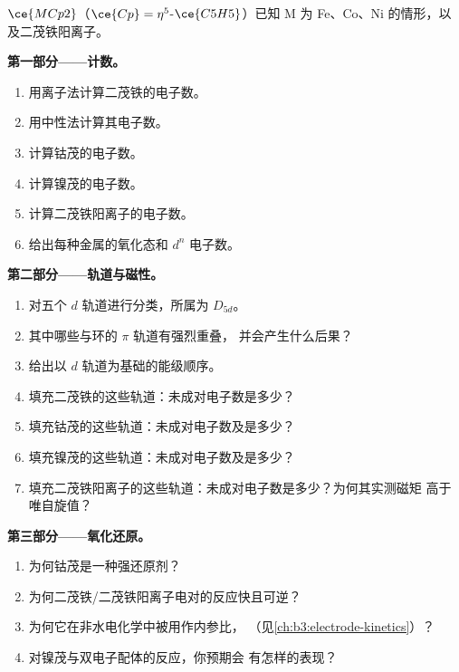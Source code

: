 \begin{problem}
\label{pb:b3:organometallic-bonding:1}
 $\ce{MCp2}$（$\ce{Cp} = \eta^5$-$\ce{C5H5}$）已知 M 为 Fe、Co、Ni 的情形，以及二茂铁阳离子。

\medskip\noindent\textbf{第一部分——计数。}
\begin{enumerate}
  \item 用离子法计算二茂铁的电子数。
  \item 用中性法计算其电子数。
  \item 计算钴茂的电子数。
  \item 计算镍茂的电子数。
  \item 计算二茂铁阳离子的电子数。
  \item 给出每种金属的氧化态和 $d^n$ 电子数。
\end{enumerate}

\medskip\noindent\textbf{第二部分——轨道与磁性。}
\begin{enumerate}[resume]
  \item 对五个 $d$ 轨道进行分类，所属为 $D_{5d}$。
  \item 其中哪些与环的 $\pi$ 轨道有强烈重叠，
        并会产生什么后果？
  \item 给出以 $d$ 轨道为基础的能级顺序。
  \item 填充二茂铁的这些轨道：未成对电子数是多少？
  \item 填充钴茂的这些轨道：未成对电子数及是多少？
  \item 填充镍茂的这些轨道：未成对电子数及是多少？
  \item 填充二茂铁阳离子的这些轨道：未成对电子数是多少？为何其实测磁矩
        高于唯自旋值？
\end{enumerate}

\medskip\noindent\textbf{第三部分——氧化还原。}
\begin{enumerate}[resume]
  \item 为何钴茂是一种强还原剂？
  \item 为何二茂铁/二茂铁阳离子电对的反应快且可逆？
  \item 为何它在非水电化学中被用作内参比，
        （见\cref{ch:b3:electrode-kinetics}）？
  \item 对镍茂与双电子配体的反应，你预期会
        有怎样的表现？
\end{enumerate}


\end{problem}
